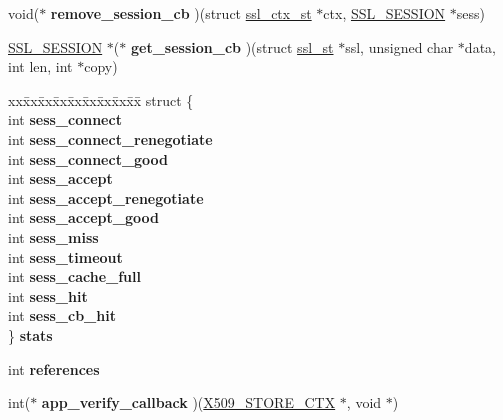 \begin{DoxyCompactItemize}
\item 
\hypertarget{structssl__ctx__st_a52d5ac51adc42ec8253a089cbc25afcc}{}void($\ast$ {\bfseries remove\+\_\+session\+\_\+cb} )(struct \hyperlink{structssl__ctx__st}{ssl\+\_\+ctx\+\_\+st} $\ast$ctx, \hyperlink{structssl__session__st}{S\+S\+L\+\_\+\+S\+E\+S\+S\+I\+O\+N} $\ast$sess)\label{structssl__ctx__st_a52d5ac51adc42ec8253a089cbc25afcc}

\item 
\hypertarget{structssl__ctx__st_ac177321ecedb6c1adc3b8abb703607c2}{}\hyperlink{structssl__session__st}{S\+S\+L\+\_\+\+S\+E\+S\+S\+I\+O\+N} $\ast$($\ast$ {\bfseries get\+\_\+session\+\_\+cb} )(struct \hyperlink{structssl__st}{ssl\+\_\+st} $\ast$ssl, unsigned char $\ast$data, int len, int $\ast$copy)\label{structssl__ctx__st_ac177321ecedb6c1adc3b8abb703607c2}

\item 
\hypertarget{structssl__ctx__st_ae4fa7d9ec9b52b9a3d115151194541bd}{}\begin{tabbing}
xx\=xx\=xx\=xx\=xx\=xx\=xx\=xx\=xx\=\kill
struct \{\\
\>int {\bfseries sess\_connect}\\
\>int {\bfseries sess\_connect\_renegotiate}\\
\>int {\bfseries sess\_connect\_good}\\
\>int {\bfseries sess\_accept}\\
\>int {\bfseries sess\_accept\_renegotiate}\\
\>int {\bfseries sess\_accept\_good}\\
\>int {\bfseries sess\_miss}\\
\>int {\bfseries sess\_timeout}\\
\>int {\bfseries sess\_cache\_full}\\
\>int {\bfseries sess\_hit}\\
\>int {\bfseries sess\_cb\_hit}\\
\} {\bfseries stats}\label{structssl__ctx__st_ae4fa7d9ec9b52b9a3d115151194541bd}
\\

\end{tabbing}\item 
\hypertarget{structssl__ctx__st_aaefa58bdf5771d0ae34e05dbc372f6c3}{}int {\bfseries references}\label{structssl__ctx__st_aaefa58bdf5771d0ae34e05dbc372f6c3}

\item 
\hypertarget{structssl__ctx__st_a15acd6b0d3d6e8307c6c67e7d46c9e96}{}int($\ast$ {\bfseries app\+\_\+verify\+\_\+callback} )(\hyperlink{structx509__store__ctx__st}{X509\+\_\+\+S\+T\+O\+R\+E\+\_\+\+C\+T\+X} $\ast$, void $\ast$)\label{structssl__ctx__st_a15acd6b0d3d6e8307c6c67e7d46c9e96}


\end{DoxyCompactItemize}
